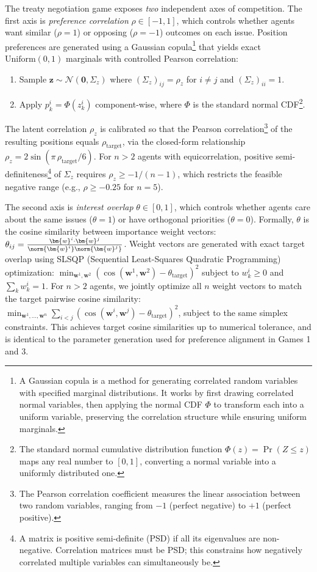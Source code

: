The treaty negotiation game exposes \emph{two} independent axes of competition.
The first axis is \emph{preference correlation} $\rho \in [-1,1]$, which controls whether agents want similar ($\rho = 1$) or opposing ($\rho = -1$) outcomes on each issue.
Position preferences are generated using a Gaussian copula\footnote{A Gaussian copula is a method for generating correlated random variables with specified marginal distributions. It works by first drawing correlated normal variables, then applying the normal CDF $\Phi$ to transform each into a uniform variable, preserving the correlation structure while ensuring uniform marginals.} that yields exact $\text{Uniform}(0,1)$ marginals with controlled Pearson correlation:
\begin{enumerate}
    \item Sample $\bm{z} \sim \mathcal{N}(\bm{0}, \Sigma_z)$ where $(\Sigma_z)_{ij} = \rho_z$ for $i \neq j$ and $(\Sigma_z)_{ii} = 1$.
    \item Apply $p^i_k = \Phi(z^i_k)$ component-wise, where $\Phi$ is the standard normal CDF\footnote{The standard normal cumulative distribution function $\Phi(z) = \Pr(Z \leq z)$ maps any real number to $[0,1]$, converting a normal variable into a uniformly distributed one.}.
\end{enumerate}
The latent correlation $\rho_z$ is calibrated so that the Pearson correlation\footnote{The Pearson correlation coefficient measures the linear association between two random variables, ranging from $-1$ (perfect negative) to $+1$ (perfect positive).} of the resulting positions equals $\rho_{\text{target}}$, via the closed-form relationship $\rho_z = 2\sin(\pi\,\rho_{\text{target}} / 6)$.
For $n > 2$ agents with equicorrelation, positive semi-definiteness\footnote{A matrix is positive semi-definite (PSD) if all its eigenvalues are non-negative. Correlation matrices must be PSD; this constrains how negatively correlated multiple variables can simultaneously be.} of $\Sigma_z$ requires $\rho_z \geq -1/(n-1)$, which restricts the feasible negative range (e.g., $\rho \geq -0.25$ for $n = 5$).

The second axis is \emph{interest overlap} $\theta \in [0,1]$, which controls whether agents care about the same issues ($\theta = 1$) or have orthogonal priorities ($\theta = 0$).
Formally, $\theta$ is the cosine similarity between importance weight vectors: $\theta_{ij} = \frac{\bm{w}^{i} \cdot \bm{w}^{j}}{\norm{\bm{w}^{i}} \norm{\bm{w}^{j}}}$.
Weight vectors are generated with exact target overlap using SLSQP (Sequential Least-Squares Quadratic Programming) optimization: $\min_{\bm{w}^1, \bm{w}^2} (\cos(\bm{w}^1, \bm{w}^2) - \theta_{\text{target}})^2$ subject to $w^i_k \geq 0$ and $\sum_k w^i_k = 1$.
For $n > 2$ agents, we jointly optimize all $n$ weight vectors to match the target pairwise cosine similarity: $\min_{\bm{w}^1, \ldots, \bm{w}^n} \sum_{i < j} (\cos(\bm{w}^i, \bm{w}^j) - \theta_{\text{target}})^2$, subject to the same simplex constraints.
This achieves target cosine similarities up to numerical tolerance, and is identical to the parameter generation used for preference alignment in Games 1 and 3.

